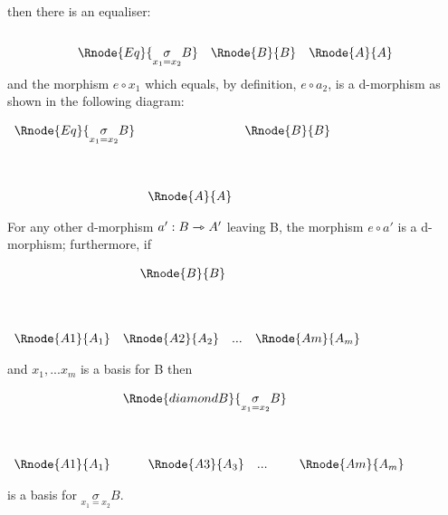 \documentclass[10pt,a4paper]{scrartcl}
\begin{document}
\begin{enumerate} [(i)]
then there is an equaliser: \\
\
\setlength{\arraycolsep}{.75cm}
$$
\begin{array}{ccc}
\Rnode{Eq}{\underset{x_1=x_2}{\sigma}B} & \Rnode{B}{B}  & \Rnode{A}{A} \\
\end{array}
$$
\noindent and the morphism $e \circ x_1$ which equals, by definition, $e \circ a_2$,  is a d-morphism as shown
in the following diagram:
\vspace{.2cm}
\begin{center}
\setlength{\arraycolsep}{.3cm}
$
\begin{array}{ccc}
\Rnode{Eq}{\underset{x_1=x_2}{\sigma}B} & &\Rnode{B}{B} \\[1.4cm]
 & \Rnode{A}{A} &\\
\end{array}
$
\end{center}

\noindent For any other d-morphism $a':B\rightarrowtriangle A'$ leaving B, the morphism $e \circ a'$ is a d-morphism; furthermore, if
\begin{center}
\setlength{\arraycolsep}{.1cm}
$
\begin{array}{ccp{.3cm}c}
                  & \multicolumn{2}{c}{\Rnode{B}{B}}& \\ [1.4cm]
\Rnode{A1}{A_1} &\Rnode{A2}{A_2}& ... & \Rnode{Am}{A_m}\\
\end{array}
$
\end{center}
and $x_1,...x_m$ is a basis for B 
then

\begin{center}
\setlength{\arraycolsep}{.1cm}
$
\begin{array}{cp{.35cm}cp{.4cm}c}
                  & \multicolumn{3}{c}{\Rnode{diamondB}{\underset{x_1=x_2}{\sigma}B}}& \\ [1.4cm]
\Rnode{A1}{A_1} & &\Rnode{A3}{A_3} &... & \Rnode{Am}{A_m}\\
\end{array}
$
\end{center}
\setlength{\arraycolsep}{0.1cm}
\noindent is a basis for $\underset{x_1=x_2}{\sigma}B$. 


\end{enumerate}
\end{document}
